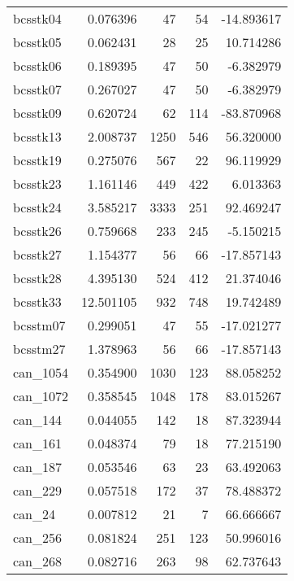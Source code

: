 \begin{tabular}{lrrrr}
bcsstk04 &   0.076396 &                        47 &                      54 &   -14.893617 \\
bcsstk05 &   0.062431 &                        28 &                      25 &    10.714286 \\
bcsstk06 &   0.189395 &                        47 &                      50 &    -6.382979 \\
bcsstk07 &   0.267027 &                        47 &                      50 &    -6.382979 \\
bcsstk09 &   0.620724 &                        62 &                     114 &   -83.870968 \\
bcsstk13 &   2.008737 &                      1250 &                     546 &    56.320000 \\
bcsstk19 &   0.275076 &                       567 &                      22 &    96.119929 \\
bcsstk23 &   1.161146 &                       449 &                     422 &     6.013363 \\
bcsstk24 &   3.585217 &                      3333 &                     251 &    92.469247 \\
bcsstk26 &   0.759668 &                       233 &                     245 &    -5.150215 \\
bcsstk27 &   1.154377 &                        56 &                      66 &   -17.857143 \\
bcsstk28 &   4.395130 &                       524 &                     412 &    21.374046 \\
bcsstk33 &  12.501105 &                       932 &                     748 &    19.742489 \\
bcsstm07 &   0.299051 &                        47 &                      55 &   -17.021277 \\
bcsstm27 &   1.378963 &                        56 &                      66 &   -17.857143 \\
can_1054 &   0.354900 &                      1030 &                     123 &    88.058252 \\
can_1072 &   0.358545 &                      1048 &                     178 &    83.015267 \\
can_144  &   0.044055 &                       142 &                      18 &    87.323944 \\
can_161  &   0.048374 &                        79 &                      18 &    77.215190 \\
can_187  &   0.053546 &                        63 &                      23 &    63.492063 \\
can_229  &   0.057518 &                       172 &                      37 &    78.488372 \\
can_24   &   0.007812 &                        21 &                       7 &    66.666667 \\
can_256  &   0.081824 &                       251 &                     123 &    50.996016 \\
can_268  &   0.082716 &                       263 &                      98 &    62.737643 \\
\bottomrule
\end{tabular}